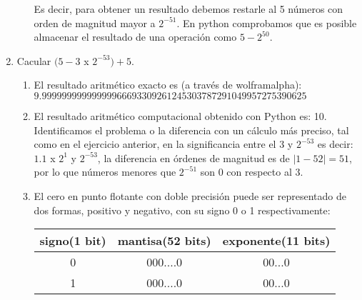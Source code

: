 \documentclass[spanish, fleqn]{article}
\begin{document}
\begin{enumerate}
\begin{enumerate}
				Es decir, para obtener un resultado debemos restarle al 5 
				números con orden de magnitud mayor a $2^{-51}$. En python 
				comprobamos que es posible almacenar el resultado de una
				operación como $5 - 2^{50}$.
		\end{enumerate}
		\item
			Cacular $(5-3$ x $2^{-53})+5$.
		\begin{enumerate}
			\item
				El resultado aritmético exacto es (a través de wolframalpha):\\
				$9.99999999999999966693309261245303787291049957275390625$
			\item
				El resultado aritmético computacional obtenido con Python es:
				10. Identificamos el problema o la diferencia con un cálculo más
				preciso, tal como en el ejercicio anterior, en la significancia
				entre el $3$ y $2^{-53}$ es decir: $ 1.1$ x $2^1$ y $ 2^{-53}$,
				la diferencia en órdenes de magnitud es de $|1 - 52| = 51$, por
				lo que números menores que $2^{-51}$ son 0 con respecto al 3.
			\item
				El cero en punto flotante con doble precisión puede ser
				representado de dos formas, positivo y negativo, con su signo 0
				o 1 respectivamente:
				\begin{center}
					\begin{tabular}{|c|c|c|}
					\hline 
						signo(1 bit) & mantisa(52 bits) & exponente(11 bits) \\ 
					\hline 
						0 & 000....0 & 00...0 \\ 
					\hline 
						1 & 000....0 & 00...0 \\ 
					\hline 
					\end{tabular}
				\end{center}

		\end{enumerate}
	\end{enumerate}
\end{document}
